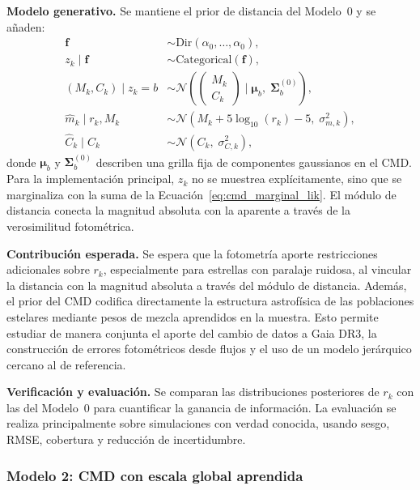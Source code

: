 \documentclass[stu, 12pt, letterpaper, donotrepeattitle, floatsintext, natbib]{apa7_ula}
\begin{document}
\textbf{Modelo generativo.}
Se mantiene el prior de distancia del Modelo~0 y se añaden:
\begin{align}
    \mathbf{f} &\sim \text{Dir}(\alpha_0, \ldots, \alpha_0),
        \label{eq:m1_weights} \\
    z_k \mid \mathbf{f} &\sim \text{Categorical}(\mathbf{f}),
        \label{eq:m1_alloc} \\
    (M_k, C_k) \mid z_k=b &\sim
        \mathcal{N}\!\left(
        \begin{pmatrix} M_k \\ C_k \end{pmatrix}
        \;\Bigg|\;
        \boldsymbol{\mu}_b,\; \boldsymbol{\Sigma}^{(0)}_b
        \right),
        \label{eq:m1_cmd} \\
    \hat{m}_k \mid r_k, M_k &\sim
        \mathcal{N}\!\left(M_k + 5\log_{10}(r_k) - 5,\;
        \sigma_{m,k}^2\right),
        \label{eq:m1_lik_m} \\
    \hat{C}_k \mid C_k &\sim
        \mathcal{N}(C_k,\; \sigma_{C,k}^2),
        \label{eq:m1_lik_C}
\end{align}
donde $\boldsymbol{\mu}_b$ y $\boldsymbol{\Sigma}^{(0)}_b$ describen una
grilla fija de componentes gaussianos en el CMD. Para la implementación
principal, $z_k$ no se muestrea explícitamente, sino que se marginaliza
con la suma de la Ecuación~\ref{eq:cmd_marginal_lik}. El módulo de
distancia conecta la magnitud absoluta con la aparente a través de la
verosimilitud fotométrica.

\textbf{Contribución esperada.}
Se espera que la fotometría aporte restricciones adicionales sobre
$r_k$, especialmente para estrellas con paralaje ruidosa, al vincular
la distancia con la magnitud absoluta a través del módulo de distancia.
Además, el prior del CMD codifica directamente la estructura
astrofísica de las poblaciones estelares mediante pesos de mezcla
aprendidos en la muestra. Esto permite estudiar de manera conjunta el
aporte del cambio de datos a Gaia DR3, la construcción de errores
fotométricos desde flujos y el uso de un modelo jerárquico cercano al
de referencia.

\textbf{Verificación y evaluación.}
Se comparan las distribuciones posteriores de $r_k$ con las del
Modelo~0 para cuantificar la ganancia de información. La evaluación se
realiza principalmente sobre simulaciones con verdad conocida, usando
sesgo, RMSE, cobertura y reducción de incertidumbre.

\subsubsection{Modelo 2: CMD con escala global aprendida}
\end{document}
